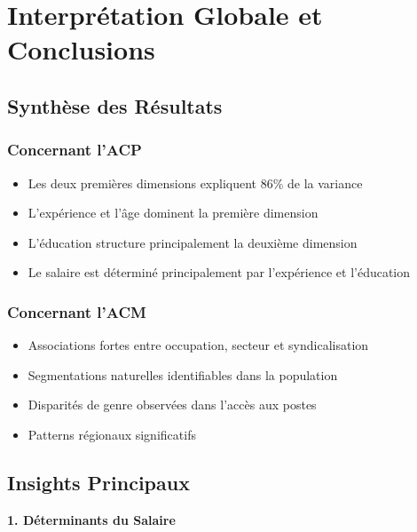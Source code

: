 \documentclass[12pt,a4paper]{report}
\begin{document}
\section{Interprétation Globale et Conclusions}

\subsection{Synthèse des Résultats}

\subsubsection{Concernant l'ACP}

\begin{itemize}
    \item Les deux premières dimensions expliquent 86\% de la variance
    \item L'expérience et l'âge dominent la première dimension
    \item L'éducation structure principalement la deuxième dimension
    \item Le salaire est déterminé principalement par l'expérience et l'éducation
\end{itemize}

\subsubsection{Concernant l'ACM}

\begin{itemize}
    \item Associations fortes entre occupation, secteur et syndicalisation
    \item Segmentations naturelles identifiables dans la population
    \item Disparités de genre observées dans l'accès aux postes
    \item Patterns régionaux significatifs
\end{itemize}

\subsection{Insights Principaux}

\textbf{1. Déterminants du Salaire}
\end{document}
